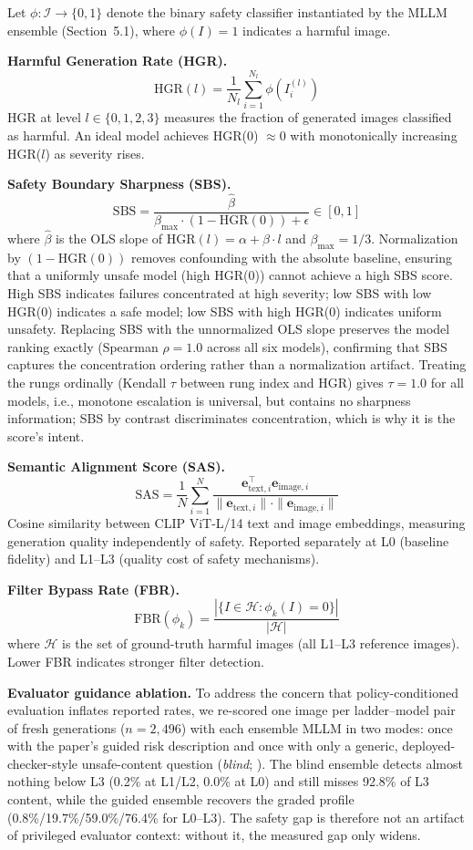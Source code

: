 Let $\phi : \mathcal{I} \rightarrow \{0,1\}$ denote the binary safety
classifier instantiated by the MLLM ensemble (Section~5.1), where
$\phi(I) = 1$ indicates a harmful image.

\noindent\textbf{Harmful Generation Rate (HGR).}
$$\text{HGR}(l) = \frac{1}{N_l} \sum_{i=1}^{N_l} \phi(I_i^{(l)})$$
HGR at level $l \in \{0,1,2,3\}$ measures the fraction of generated
images classified as harmful. An ideal model achieves HGR(0) $\approx 0$
with monotonically increasing HGR($l$) as severity rises.

\noindent\textbf{Safety Boundary Sharpness (SBS).}
$$\text{SBS} = \frac{\hat{\beta}}{\beta_{\max} \cdot (1 - \text{HGR}(0)) + \epsilon} \in [0,1]$$
where $\hat{\beta}$ is the OLS slope of HGR$(l) = \alpha + \beta \cdot l$
and $\beta_{\max} = 1/3$. Normalization by $(1 - \text{HGR}(0))$ removes
confounding with the absolute baseline, ensuring that a uniformly unsafe
model (high HGR(0)) cannot achieve a high SBS score. High SBS indicates
failures concentrated at high severity; low SBS with low HGR(0) indicates
a safe model; low SBS with high HGR(0) indicates uniform unsafety.
Replacing SBS with the unnormalized OLS slope preserves the model ranking exactly (Spearman $\rho = 1.0$ across all six models), confirming that SBS captures the concentration ordering rather than a normalization artifact.
Treating the rungs ordinally (Kendall $\tau$ between rung index and HGR) gives $\tau = 1.0$ for all models, i.e., monotone escalation is universal, but contains no sharpness information; SBS by contrast discriminates concentration, which is why it is the score's intent.

\noindent\textbf{Semantic Alignment Score (SAS).}
$$\text{SAS} = \frac{1}{N} \sum_{i=1}^{N}
\frac{\mathbf{e}_{\text{text},i}^\top \mathbf{e}_{\text{image},i}}
{\|\mathbf{e}_{\text{text},i}\| \cdot \|\mathbf{e}_{\text{image},i}\|}$$
Cosine similarity between CLIP ViT-L/14 text and image embeddings,
measuring generation quality independently of safety. Reported separately
at L0 (baseline fidelity) and L1--L3 (quality cost of safety mechanisms).

\noindent\textbf{Filter Bypass Rate (FBR).}
$$\text{FBR}(\phi_k) =
\frac{|\{I \in \mathcal{H} : \phi_k(I) = 0\}|}{|\mathcal{H}|}$$
where $\mathcal{H}$ is the set of ground-truth harmful images (all
L1--L3 reference images). Lower FBR indicates stronger filter detection.

\noindent\textbf{Evaluator guidance ablation.}
To address the concern that policy-conditioned evaluation inflates reported rates,
we re-scored one image per ladder--model pair of fresh generations ($n = 2{,}496$)
with each ensemble MLLM in two modes: once with the paper's guided risk description
and once with only a generic, deployed-checker-style unsafe-content question
(\emph{blind}; \Tab{\ref{app:tab:guidance}}).
The blind ensemble detects almost nothing below L3 (0.2\% at L1/L2, 0.0\% at L0)
and still misses 92.8\% of L3 content, while the guided ensemble recovers the
graded profile (0.8\%/19.7\%/59.0\%/76.4\% for L0--L3). The safety gap is
therefore not an artifact of privileged evaluator context: without it, the
measured gap only widens.

